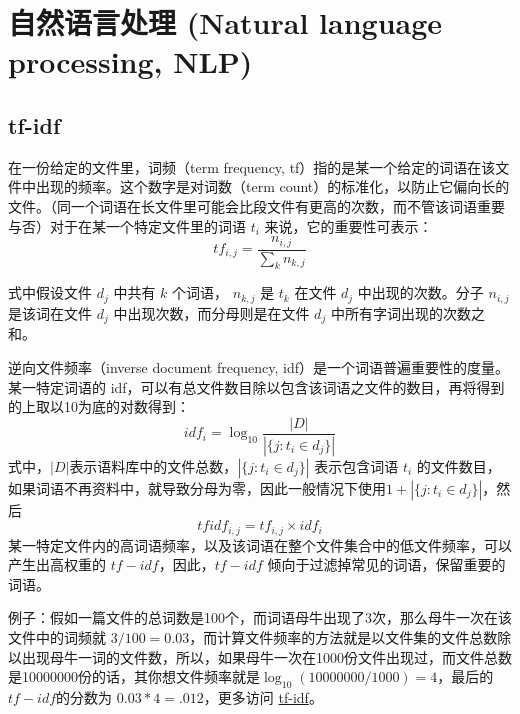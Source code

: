 \chapter{自然语言处理 (Natural language processing, NLP)}
\section{tf-idf}
在一份给定的文件里，词频（term frequency, tf）指的是某一个给定的词语在该文件中出现的频率。这个数字是对词数（term count）的标准化，以防止它偏向长的文件。（同一个词语在长文件里可能会比段文件有更高的次数，而不管该词语重要与否）对于在某一个特定文件里的词语 $t_i$ 来说，它的重要性可表示：
\begin{equation}
    tf_{i,j}=\frac{n_{i,j}}{\sum_k n_{k,j}}
\end{equation}

式中假设文件 $d_j$ 中共有 $k$ 个词语， $n_{k, j}$ 是 $t_k$ 在文件 $d_j$ 中出现的次数。分子 $n_{i,j}$ 是该词在文件 $d_j$ 中出现次数，而分母则是在文件 $d_j$ 中所有字词出现的次数之和。

逆向文件频率（inverse document frequency, idf）是一个词语普遍重要性的度量。某一特定词语的 idf，可以有总文件数目除以包含该词语之文件的数目，再将得到的上取以10为底的对数得到：
\begin{equation}
    idf_i=\log_{10}\frac{|D|}{|\{j:t_i\in d_j\}|}
\end{equation}
式中，$|D|$表示语料库中的文件总数，$|\{j:t_i\in d_j\}|$ 表示包含词语 $t_i$ 的文件数目，如果词语不再资料中，就导致分母为零，因此一般情况下使用$1+ |\{j:t_i\in d_j\}|$，然后
\begin{equation}
    tfidf_{i,j}=tf_{i,j}\times idf_i
\end{equation}
某一特定文件内的高词语频率，以及该词语在整个文件集合中的低文件频率，可以产生出高权重的 $tf-idf$，因此，$tf-idf$ 倾向于过滤掉常见的词语，保留重要的词语。

例子：假如一篇文件的总词数是100个，而词语母牛出现了3次，那么母牛一次在该文件中的词频就 $3/100=0.03$，而计算文件频率的方法就是以文件集的文件总数除以出现母牛一词的文件数，所以，如果母牛一次在1000份文件出现过，而文件总数是10000000份的话，其你想文件频率就是$\log_{10}(10000000/1000)=4$，最后的 $tf-idf$的分数为 $0.03 * 4=.012$，更多访问 \href{https://zh.wikipedia.org/wiki/Tf-idf}{tf-idf}。

